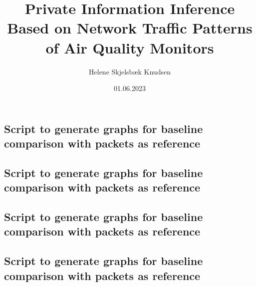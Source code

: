 \documentclass[british,titlepage]{ntnuthesis}
\title{Private Information Inference Based on Network Traffic Patterns of Air Quality Monitors}
\author{Helene Skjelsbæk Knudsen}
\date{01.06.2023}
\begin{document}





\tableofcontents
\listoffigures
\listoftables

\printglossary[type=\acronymtype] 










\chapter*{\bibname}
\printbibliography[heading=none]

\appendix
\renewcommand{\thesection}{\Alph{section}}
\appendixpage
\section{Script to generate graphs for baseline comparison with packets as reference \cite{GraphsInspiration}}
    
    \label{app:GraphsByBytes}
\newpage
\section{Script to generate graphs for baseline comparison with packets as reference \cite{GraphsInspiration}}
    
    \label{app:GraphsByPackets}
\newpage
\section{Script to generate graphs for baseline comparison with packets as reference \cite{GraphsInspiration}}
    
    \label{app:GraphsByBytes_BaselineEvents}
\newpage
\section{Script to generate graphs for baseline comparison with packets as reference \cite{GraphsInspiration}}
    
    \label{app:GraphsByPackets_BaselineEvents}
\end{document}
